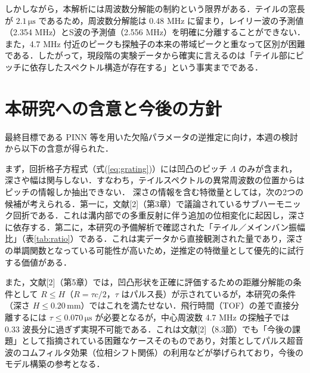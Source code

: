 \documentclass{jarticle}
\begin{document}
\par
しかしながら，本解析には周波数分解能の制約という限界がある．テイルの窓長が $2.1\,\mathrm{\mu s}$ であるため，周波数分解能は 0.48 MHz に留まり，レイリー波の予測値（2.354 MHz）とS波の予測値（2.556 MHz）を明確に分離することができない．また，4.7 MHz 付近のピークも探触子の本来の帯域ピークと重なって区別が困難である．したがって，現段階の実験データから確実に言えるのは「テイル部にピッチに依存したスペクトル構造が存在する」という事実までである．


\section{本研究への含意と今後の方針}
\par
最終目標である PINN 等を用いた欠陥パラメータの逆推定に向け，本週の検討から以下の含意が得られた．

まず，回折格子方程式（式(\ref{eq:grating})）には凹凸のピッチ $\Lambda$ のみが含まれ，深さや幅は関与しない．すなわち，テイルスペクトルの異常周波数の位置からはピッチの情報しか抽出できない．
深さの情報を含む特徴量としては，次の2つの候補が考えられる．第一に，文献[2]（第3章）で議論されているサブハーモニック回折である．これは溝内部での多重反射に伴う追加の位相変化に起因し，深さに依存する．第二に，本研究の予備解析で確認された「テイル／メインバン振幅比」（表\ref{tab:ratio}）である．これは実データから直接観測された量であり，深さの単調関数となっている可能性が高いため，逆推定の特徴量として優先的に試行する価値がある．

また，文献[2]（第5章）では，凹凸形状を正確に評価するための距離分解能の条件として $R \le H$（$R = \tau c/2$，$\tau$ はパルス長）が示されているが，本研究の条件（深さ $H \le 0.20\,\mathrm{mm}$）ではこれを満たせない．飛行時間（TOF）の差で直接分離するには $\tau \le 0.070\,\mathrm{\mu s}$ が必要となるが，中心周波数 4.7 MHz の探触子では 0.33 波長分に過ぎず実現不可能である．これは文献[2]（8.3節）でも「今後の課題」として指摘されている困難なケースそのものであり，対策としてパルス超音波のコムフィルタ効果（位相シフト関係）の利用などが挙げられており，今後のモデル構築の参考となる．
\end{document}
